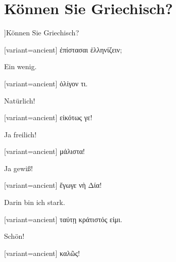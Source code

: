 \section{Können Sie Griechisch?}

]\indent Können Sie Griechisch?

\switchcolumn

\begin{greek}[variant=ancient]%
ἐπίστασαι ἑλληνίζειν;

\end{greek}%
\switchcolumn*

Ein wenig.

\switchcolumn

\begin{greek}[variant=ancient]%
ὀλίγον τι.

\end{greek}%
\switchcolumn*

Natürlich!

\switchcolumn

\begin{greek}[variant=ancient]%
εἰκότως γε!

\end{greek}%
\switchcolumn*

Ja freilich!

\switchcolumn

\begin{greek}[variant=ancient]%
μάλιστα!

\end{greek}%
\switchcolumn*

Ja gewiß!

\switchcolumn

\begin{greek}[variant=ancient]%
ἔγωγε νὴ Δία!

\end{greek}%
\switchcolumn*

Darin bin ich stark.

\switchcolumn

\begin{greek}[variant=ancient]%
ταύτῃ κράτιστός εἰμι.

\end{greek}%
\switchcolumn*

Schön!

\switchcolumn

\begin{greek}[variant=ancient]%
καλῶς!

\end{greek}%
\switchcolumn*

